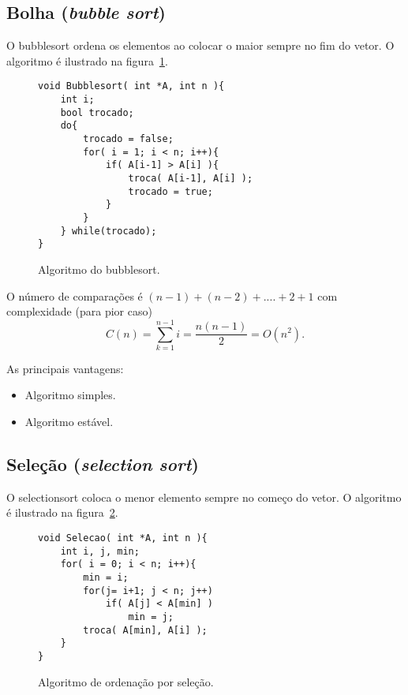 \subsection{Bolha (\emph{bubble sort})}

O bubblesort ordena os elementos ao colocar o maior sempre no fim do vetor.
O algoritmo é ilustrado na figura~\ref{aula03:algo:bubblesort}.
\begin{figure}[!htb]
\centering
\begin{framed}
\begin{lstlisting}
void Bubblesort( int *A, int n ){
	int i;
	bool trocado;
	do{
		trocado = false;
		for( i = 1; i < n; i++){
			if( A[i-1] > A[i] ){
				troca( A[i-1], A[i] );
				trocado = true;
			}
		}
	} while(trocado);
}
\end{lstlisting}
\end{framed}
\caption{Algoritmo do bubblesort.}
\label{aula03:algo:bubblesort}
\end{figure}


O número de comparações é $(n-1)+(n-2)+....+2+1$ com complexidade (para pior caso)
\begin{equation*}
C(n) = \sum_{k=1}^{n-1} i = \frac{n(n-1)}{2} = O(n^2).
\end{equation*}

As principais vantagens:
\begin{itemize}
\item Algoritmo simples.
\item Algoritmo estável.
\end{itemize}

\subsection{Seleção (\emph{selection sort})}

O selectionsort coloca o menor elemento sempre no começo do vetor.
O algoritmo é ilustrado na figura~\ref{aula03:algo:selection}.
\begin{figure}[!htb]
\centering
\begin{framed}
\begin{lstlisting}
void Selecao( int *A, int n ){
	int i, j, min;
	for( i = 0; i < n; i++){
		min = i;
		for(j= i+1; j < n; j++)
			if( A[j] < A[min] )
				min = j;
		troca( A[min], A[i] );
	}
}
\end{lstlisting}
\end{framed}
\caption{Algoritmo de ordenação por seleção.}
\label{aula03:algo:selection}
\end{figure}

